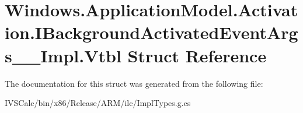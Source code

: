 \hypertarget{struct_windows_1_1_application_model_1_1_activation_1_1_i_background_activated_event_args_____impl_1_1_vtbl}{}\section{Windows.\+Application\+Model.\+Activation.\+I\+Background\+Activated\+Event\+Args\+\_\+\+\_\+\+Impl.\+Vtbl Struct Reference}
\label{struct_windows_1_1_application_model_1_1_activation_1_1_i_background_activated_event_args_____impl_1_1_vtbl}


The documentation for this struct was generated from the following file\+:\begin{DoxyCompactItemize}
\item 
I\+V\+S\+Calc/bin/x86/\+Release/\+A\+R\+M/ilc/Impl\+Types.\+g.\+cs\end{DoxyCompactItemize}
